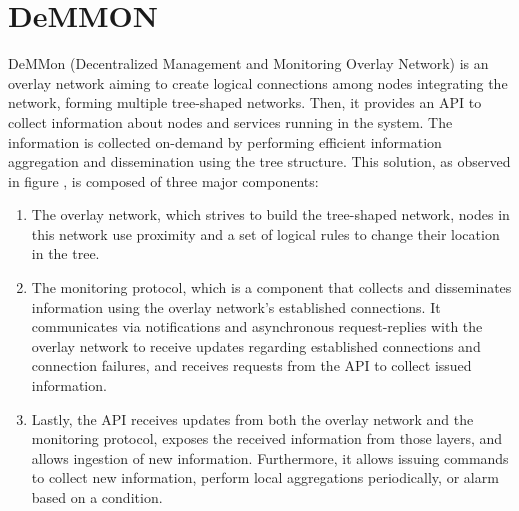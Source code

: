 

\chapter{DeMMON}
\label{cha:demmon}

DeMMon (Decentralized Management and Monitoring Overlay Network) is an overlay network aiming to create logical connections among nodes integrating the network, forming multiple tree-shaped networks. Then, it provides an API to collect information about nodes and services running in the system. The information is collected on-demand by performing efficient information aggregation and dissemination using the tree structure. This solution, as observed in figure , is composed of three major components:

\begin{enumerate}
    \item The overlay network, which strives to build the tree-shaped network, nodes in this network use proximity and a set of logical rules to change their location in the tree.

    \item The monitoring protocol, which is a component that collects and disseminates information using the overlay network's established connections. It communicates via notifications and asynchronous request-replies with the overlay network to receive updates regarding established connections and connection failures, and receives requests from the API to collect issued information.

    \item Lastly, the API receives updates from both the overlay network and the monitoring protocol, exposes the received information from those layers, and allows ingestion of new information. Furthermore, it allows issuing commands to collect new information, perform local aggregations periodically, or alarm based on a condition.
\end{enumerate}


